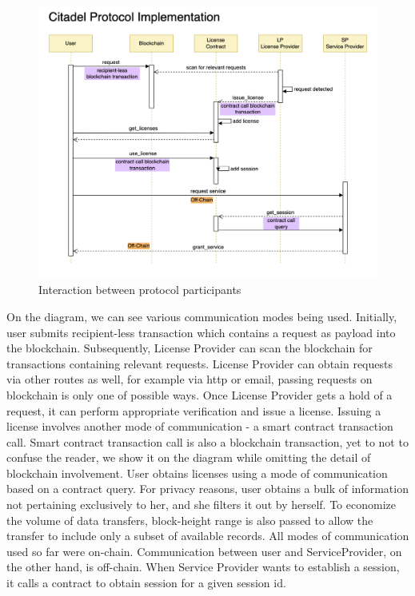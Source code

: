 \begin{figure}[h]
	\centering
		\includegraphics[width=390pt,draft=false]{images/implementation.png}
	\caption{Interaction between protocol participants}
	\label{fig:implementation}
\end{figure}

\begin{flushleft}
On the diagram, we can see various communication modes being used. Initially, user submits recipient-less transaction which contains a request as payload into the blockchain. Subsequently, License Provider can scan the blockchain for transactions containing relevant requests. License Provider can obtain requests via other routes as well, for example via http or email, passing requests on blockchain is only one of possible ways. Once License Provider gets a hold of a request, it can perform appropriate verification and issue a license. Issuing a license involves another mode of communication - a smart contract transaction call. Smart contract transaction call is also a blockchain transaction, yet to not to confuse the reader, we show it on the diagram while omitting the detail of blockchain  involvement. User obtains licenses using a mode of communication based on a contract query. For privacy reasons, user obtains a bulk of information not pertaining exclusively to her, and she filters it out by herself. To economize the volume of data transfers, block-height range is also passed to allow the transfer to include only a subset of available records. All modes of communication used so far were on-chain. Communication between user and ServiceProvider, on the other hand, is off-chain. When Service Provider wants to establish a session, it calls a contract to obtain session for a given session id.
\end{flushleft}

